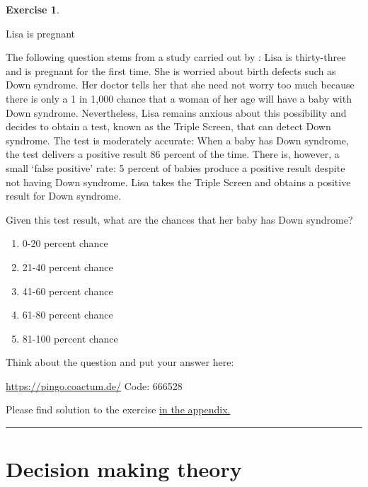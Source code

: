 \documentclass[
  12pt,
  oneside]{book}
\providecommand{\tightlist}{%
  \setlength{\itemsep}{0pt}\setlength{\parskip}{0pt}}
\theoremstyle{definition}
\theoremstyle{definition}
\theoremstyle{definition}
\newtheorem{exercise}{Exercise}[chapter]
\theoremstyle{definition}
\theoremstyle{remark}
\begin{document}
\begin{exercise}
\protect\hypertarget{exr:lisapregnant}{}\label{exr:lisapregnant}

Lisa is pregnant

The following question stems from a study carried out by \citet{Kahneman1972Subjective}: Lisa is thirty-three and is pregnant for the first time. She is worried about birth defects such as Down syndrome. Her doctor tells her that she need not worry too much because there is only a 1 in 1,000 chance that a woman of her age will have a baby with Down syndrome. Nevertheless, Lisa remains anxious about this possibility and decides to obtain a test, known as the Triple Screen, that can detect Down syndrome. The test is moderately accurate: When a baby has Down syndrome, the test delivers a positive result 86 percent of the time. There is, however, a small `false positive' rate: 5 percent of babies produce a positive result despite not having Down syndrome. Lisa takes the Triple Screen and obtains a positive result for Down syndrome.

Given this test result, what are the chances that her baby has Down syndrome?

\begin{enumerate}
\def\labelenumi{\alph{enumi})}
\tightlist
\item
  0-20 percent chance
\item
  21-40 percent chance
\item
  41-60 percent chance
\item
  61-80 percent chance
\item
  81-100 percent chance
\end{enumerate}

Think about the question and put your answer here:

\url{https://pingo.coactum.de/} Code: 666528

Please find solution to the exercise \protect\hyperlink{sol:lisapregnant}{in the appendix.}

\begin{center}\rule{0.5\linewidth}{0.5pt}\end{center}

\end{exercise}

\hypertarget{decision-making-theory}{%
\chapter{Decision making theory}\label{decision-making-theory}}
\end{document}
